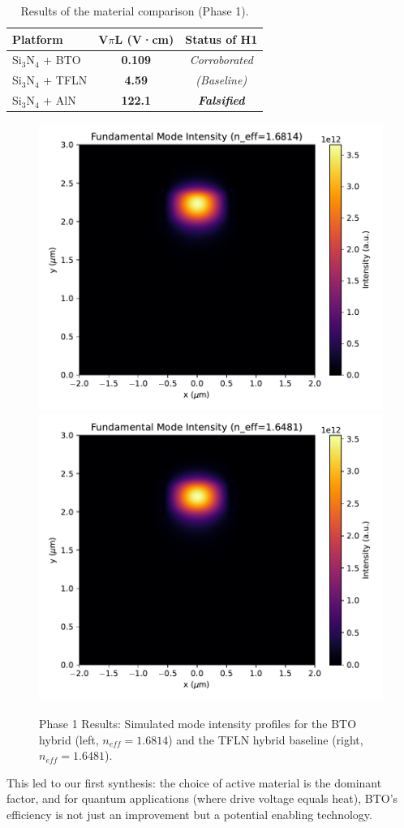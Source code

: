 \documentclass{article}
\begin{document}
\begin{table}[H]
\caption{Results of the material comparison (Phase 1).}
\label{tab:cycle1}
\centering
\begin{tabular}{lcc}
\toprule
\textbf{Platform} & \textbf{V$\pi$L (V·cm)} & \textbf{Status of H1} \\
\midrule
Si$_3$N$_4$ + BTO & \textbf{0.109} & \textit{Corroborated} \\
Si$_3$N$_4$ + TFLN & \textbf{4.59} & \textit{(Baseline)} \\
Si$_3$N$_4$ + AlN & \textbf{122.1} & \textbf{\textit{Falsified}} \\
\bottomrule
\end{tabular}
\end{table}

\begin{figure}[H]
    \centering
    \includegraphics[width=0.49\linewidth]{simulation_intensity_BTO.pdf}
    \includegraphics[width=0.49\linewidth]{simulation_intensity_TFLN.pdf}
    \caption{Phase 1 Results: Simulated mode intensity profiles for the BTO hybrid (left, $n_{eff}=1.6814$) and the TFLN hybrid baseline (right, $n_{eff}=1.6481$).}
    \label{fig:cycle1_modes}
\end{figure}

This led to our first synthesis: the choice of active material is the dominant factor, and for quantum applications (where drive voltage equals heat), BTO's efficiency is not just an improvement but a potential enabling technology.
\end{document}
